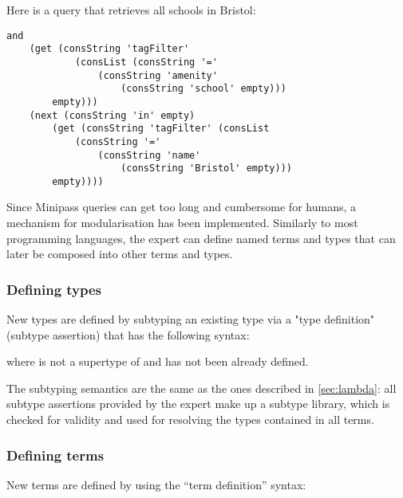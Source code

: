 \documentclass[main.tex]{subfiles}
\begin{document}
\begin{example}
\label{example:schools}
    Here is a query that retrieves all schools in Bristol:
    \begin{lstwrap}\begin{lstlisting}
and
    (get (consString 'tagFilter'
            (consList (consString '='
                (consString 'amenity'
                    (consString 'school' empty)))
        empty)))
    (next (consString 'in' empty)
        (get (consString 'tagFilter' (consList
            (consString '='
                (consString 'name'
                    (consString 'Bristol' empty)))
        empty))))
    \end{lstlisting}\end{lstwrap}
\end{example}

Since Minipass queries can get too long and cumbersome for humans,
a mechanism for modularisation has been implemented. Similarly to most
programming languages, the expert can define
named terms and types that can later be composed into other terms and types.

\subsubsection{Defining types}\label{sec:definingtypes}
New types are defined by subtyping an existing type via a "type definition"
(subtype assertion) that has the following syntax:
\begin{center}
\end{center}
where  is not a supertype of  and has not been
already defined.

The subtyping semantics
are the same as the ones described in \cref{sec:lambda}: all subtype assertions
provided by the expert
make up a subtype library, which is checked for validity and used for resolving
the types contained in all terms.

\subsubsection{Defining terms}
New terms are defined by using the ``term definition'' syntax:
\begin{center}
\end{center}
\end{document}
